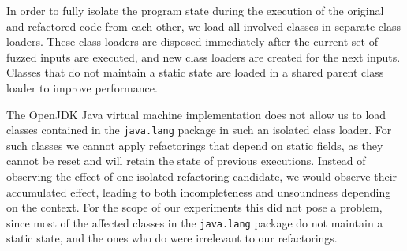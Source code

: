 \documentclass[sigconf,review,anonymous]{acmart}
\begin{document}
In order to fully isolate the program state during the execution of the original and refactored code from each other, we load all involved classes in separate
class loaders. These class loaders are disposed immediately after the current set
of fuzzed inputs are executed, and new class loaders are created for the next
inputs. %
Classes that do not maintain a static state are loaded in a shared
parent class loader to improve performance.

The OpenJDK Java virtual machine implementation does not allow us to load
classes contained in the \texttt{java.lang} package in such an isolated class
loader. For such classes we cannot apply refactorings that depend on static
fields, as they cannot be reset and will retain the state of previous
executions. Instead of observing the effect of one isolated refactoring
candidate, we would observe their accumulated effect, leading to both
incompleteness and unsoundness depending on the context. For the scope of our
experiments this did not pose a problem, since most of the affected classes in
the \texttt{java.lang} package do not maintain a static state, and the ones who do
were irrelevant to our refactorings.





\end{document}
